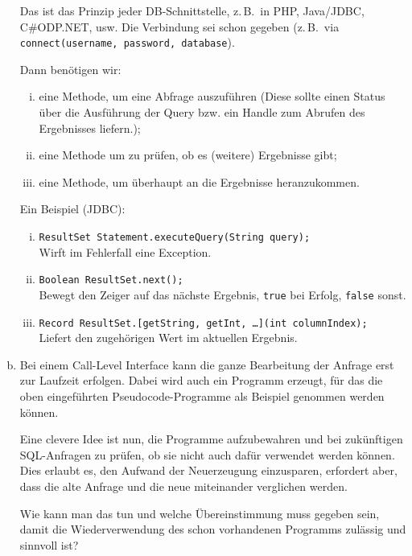 \begin{enumerate}[a)]
	\begin{solution}
	Das ist das Prinzip jeder DB-Schnittstelle, z.\,B.\ in PHP, Java/JDBC, C\#ODP.NET, usw. Die Verbindung sei schon gegeben (z.\,B.\ via \texttt{connect(username, password, database}).

	Dann benötigen wir:
	\begin{enumerate}[i)]
		\item eine Methode, um eine Abfrage auszuführen (Diese sollte einen Status über die Ausführung der Query bzw. ein Handle zum Abrufen des Ergebnisses liefern.);
		\item eine Methode um zu prüfen, ob es (weitere) Ergebnisse gibt;
		\item eine Methode, um überhaupt an die Ergebnisse heranzukommen.
	\end{enumerate}

	Ein Beispiel (JDBC):
	\begin{enumerate}[i)]
		\item \texttt{ResultSet Statement.executeQuery(String query);}\\
		Wirft im Fehlerfall eine Exception.
		\item \texttt{Boolean ResultSet.next();}\\
		Bewegt den Zeiger auf das nächste Ergebnis, \texttt{true} bei Erfolg, \texttt{false} sonst.
		\item \texttt{Record ResultSet.[getString, getInt, \ldots](int columnIndex);}\\
		Liefert den zugehörigen Wert im aktuellen Ergebnis.
	\end{enumerate}

	\end{solution}
\beamertxt{\pagebreak}

	\item Bei einem Call-Level Interface kann die ganze Bearbeitung der Anfrage erst zur Laufzeit erfolgen. Dabei wird auch ein Programm erzeugt, für das die oben eingeführten Pseudocode-Programme als Beispiel genommen werden können.

	Eine clevere Idee ist nun, die Programme aufzubewahren und bei zukünftigen SQL-Anfragen zu prüfen, ob sie nicht auch dafür verwendet werden können. Dies erlaubt es, den Aufwand der Neuerzeugung einzusparen, erfordert aber, dass die alte Anfrage und die neue miteinander verglichen werden.

	Wie kann man das tun und welche Übereinstimmung muss gegeben sein, damit die Wiederverwendung des schon vorhandenen Programms zulässig und sinnvoll ist?


\end{enumerate}
